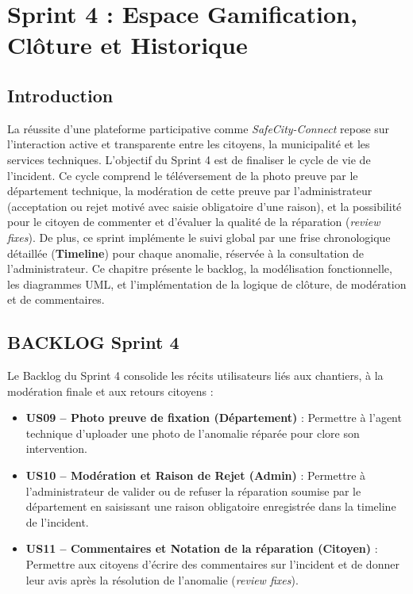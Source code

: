 
\chapter[Sprint 4 : Gamification et Historique]{Sprint 4 : Espace Gamification, Clôture et Historique}

\section*{Introduction}
La réussite d'une plateforme participative comme \textit{SafeCity-Connect} repose sur l'interaction active et transparente entre les citoyens, la municipalité et les services techniques. L'objectif du Sprint 4 est de finaliser le cycle de vie de l'incident. Ce cycle comprend le téléversement de la photo preuve par le département technique, la modération de cette preuve par l'administrateur (acceptation ou rejet motivé avec saisie obligatoire d'une raison), et la possibilité pour le citoyen de commenter et d'évaluer la qualité de la réparation (\textit{review fixes}). De plus, ce sprint implémente le suivi global par une frise chronologique détaillée (\textbf{Timeline}) pour chaque anomalie, réservée à la consultation de l'administrateur. Ce chapitre présente le backlog, la modélisation fonctionnelle, les diagrammes UML, et l'implémentation de la logique de clôture, de modération et de commentaires.

\section{BACKLOG Sprint 4}
Le Backlog du Sprint 4 consolide les récits utilisateurs liés aux chantiers, à la modération finale et aux retours citoyens :
\begin{itemize}
    \item \textbf{US09 -- Photo preuve de fixation (Département)} : Permettre à l'agent technique d'uploader une photo de l'anomalie réparée pour clore son intervention.
    \item \textbf{US10 -- Modération et Raison de Rejet (Admin)} : Permettre à l'administrateur de valider ou de refuser la réparation soumise par le département en saisissant une raison obligatoire enregistrée dans la timeline de l'incident.
    \item \textbf{US11 -- Commentaires et Notation de la réparation (Citoyen)} : Permettre aux citoyens d'écrire des commentaires sur l'incident et de donner leur avis après la résolution de l'anomalie (\textit{review fixes}).
\end{itemize}

